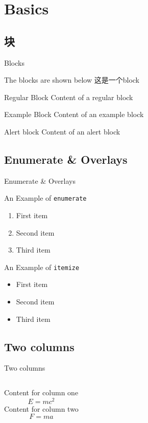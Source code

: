 \documentclass[
10pt,
aspectratio=43,
]{beamer}
\begin{document}
\section{Basics}
\subsection{块}
\begin{frame}[c]{Blocks}
	
The blocks are shown below
这是一个block
\begin{block}{Regular Block}
	Content of a regular block
\end{block}

\begin{exampleblock}{Example Block}
	Content of an example block
\end{exampleblock}

\begin{alertblock}{Alert block}
	Content of an alert block
\end{alertblock}

\end{frame}	

\subsection{Enumerate \& Overlays}

\begin{frame}[c]{Enumerate \& Overlays}
	
{\large An Example of \texttt{enumerate}}
	\begin{enumerate}[<+->]
		\item First item
		\item Second item
		\item Third item
	\end{enumerate}
\vfill
{\large An Example of \texttt{itemize}}	
	\begin{itemize}[<+->]
	\item First item
	\item Second item
	\item Third item
	\end{itemize}
\end{frame}	

\subsection{Two columns}
\begin{frame}[c]{Two columns}
	
\begin{columns}[onlytextwidth]
	Content for column one
	\begin{equation}
	E = mc^2
	\end{equation}
	Content for column two
	\begin{equation}
	F=ma
	\end{equation}
\end{columns}
\end{frame}	
\end{document}
